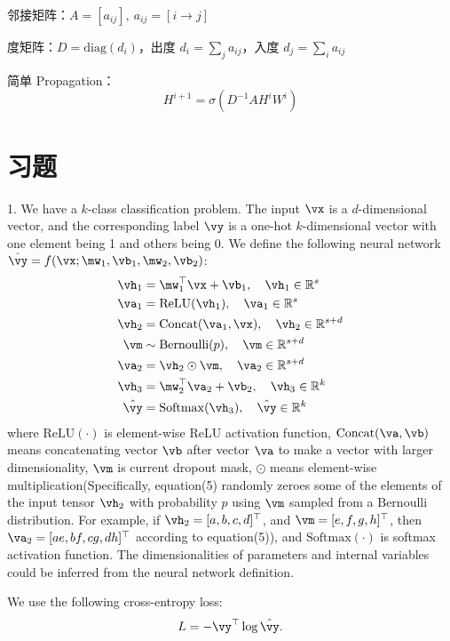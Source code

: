 \documentclass[openany]{ctexbook}
\theoremstyle{kaiti}
\theoremstyle{normal}
\begin{document}
邻接矩阵：$A=\left[a_{ij} \right],~a_{ij}=\left[i\rightarrow j \right]$

度矩阵：$D=\mathrm{diag}\left(d_i \right)$，出度 $d_i=\sum_ja_{ij}$，入度 $d_j=\sum_ia_{ij}$

简单 Propagation：
\begin{equation}
H^{i+1}=\sigma \left(D^{-1}AH^iW^i \right)
\end{equation}

\section{习题}


1. We have a $k$-class classification problem. The input $\vx$ is a $d$-dimensional vector, and the corresponding label $\vy$ is a one-hot $k$-dimensional vector with one element being 1 and others being 0. We define the following neural network $\hat{\vy}=f(\vx;\mw_1, \vb_1, \mw_2, \vb_2)$:
\begin{align}
  \vh_1 &= \mw_1^\top\vx + \vb_1,\quad \vh_1\in\mathbb R^s \\
  \va_1 &= \mathrm{ReLU}(\vh_1),\quad \va_1\in\mathbb R^s \\
  \vh_2 &= \mathrm{Concat}(\va_1, \vx),\quad \vh_2\in\mathbb R^{s+d} \\
  \vm &\sim \mathrm{Bernoulli}(p),\quad \vm\in\mathbb R^{s+d}\\
  \va_2 &= \vh_2\odot\vm,\quad \va_2\in\mathbb R^{s+d}\\
  \vh_3 &= \mw_2^\top\va_2 + \vb_2,\quad \vh_3\in\mathbb R^k \\
  \hat{\vy} &= \mathrm{Softmax}(\vh_3),\quad \hat{\vy}\in\mathbb R^k
\end{align}
where $\mathrm{ReLU}(\cdot)$ is element-wise ReLU activation function, $\mathrm{Concat}(\va, \vb)$ means concatenating vector $\vb$ after vector $\va$ to make a vector with larger dimensionality, $\vm$ is current dropout mask, $\odot$ means element-wise multiplication(Specifically, equation(5) randomly zeroes some of the elements of the input tensor $\vh_2$ with probability $p$ using $\vm$ sampled from a $\mathrm{Bernoulli}$ distribution. For example, if $\vh_2 = [a,b,c,d]^\top$, and $\vm = [e,f,g,h]^\top$, then $\va_2 = [ae,bf,cg,dh]^\top$ according to equation(5)), and $\mathrm{Softmax}(\cdot)$ is softmax activation function. The dimensionalities of parameters and internal variables could be inferred from the neural network definition.

We use the following cross-entropy loss:
\begin{equation}
  L=-\vy^\top\log\hat{\vy}.
  \label{eq:crossEntropy}
\end{equation}
\end{document}
